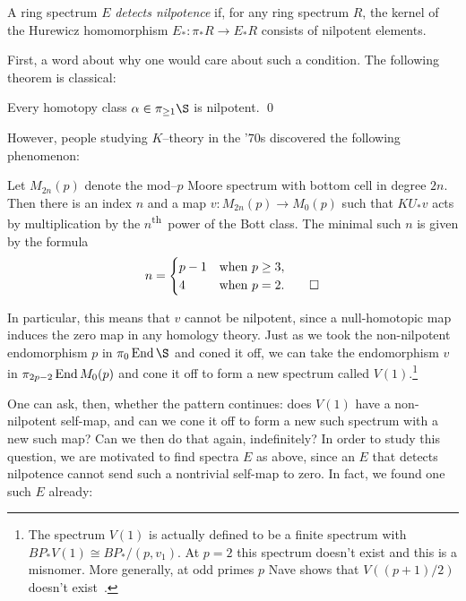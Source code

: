 \begin{definition}
A ring spectrum $E$ \textit{detects nilpotence} if, for any ring spectrum $R$, the kernel of the Hurewicz homomorphism $E_*: \pi_* R \to E_* R$ consists of nilpotent elements.
\end{definition}

First, a word about why one would care about such a condition.  The following theorem is classical:
\begin{theorem}[Nishida]
Every homotopy class $\alpha \in \pi_{\ge 1} \S$ is nilpotent. \qed
\end{theorem}

\noindent However, people studying $K$--theory in the '$70$s discovered the following phenomenon:

\begin{theorem}[Adams]
Let $M_{2n}(p)$ denote the mod--$p$ Moore spectrum with bottom cell in degree $2n$.  Then there is an index $n$ and a map $v: M_{2n}(p) \to M_0(p)$ such that $KU_* v$ acts by multiplication by the $n$\textsuperscript{th}\, power of the Bott class.  The minimal such $n$ is given by the formula \[n = \begin{cases} p-1 & \text{when $p \ge 3$}, \\ 4 & \text{when $p = 2$}. \qed \end{cases}\]
\end{theorem}

\noindent In particular, this means that $v$ cannot be nilpotent, since a null-homotopic map induces the zero map in any homology theory.  Just as we took the non-nilpotent endomorphism $p$ in $\pi_0 \End \S$ and coned it off, we can take the endomorphism $v$ in $\pi_{2p-2} \operatorname{End} M_0(p)$ and cone it off to form a new spectrum called $V(1)$.\footnote{The spectrum $V(1)$ is actually defined to be a finite spectrum with $BP_* V(1) \cong BP_* / (p, v_1)$. At $p = 2$ this spectrum doesn't exist and this is a misnomer.  More generally, at odd primes $p$ Nave shows that $V((p+1)/2)$ doesn't exist~\cite[Theorem 1.3]{Nave}.}

One can ask, then, whether the pattern continues: does $V(1)$ have a non-nilpotent self-map, and can we cone it off to form a new such spectrum with a new such map?  Can we then do that again, indefinitely?  In order to study this question, we are motivated to find spectra $E$ as above, since an $E$ that detects nilpotence cannot send such a nontrivial self-map to zero.  In fact, we found one such $E$ already:

